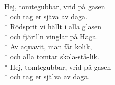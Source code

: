 \begin{SongText}
    \begin{SongVerse}
        Hej, tomtegubbar, vrid på gasen\\*%
        och tag er sjäva av daga.\\*%
        Rödsprit vi hällt i alla glasen\\*%
        och fjäril’n vinglar på Haga.\\*%
        Av aquavit, man får kolik,\\*%
        och alla tomtar skola-stå-lik.\\*%
        Hej, tomtegubbar, vrid på gasen\\*%
        och tag er själva av daga.
    \end{SongVerse}
\end{SongText}
